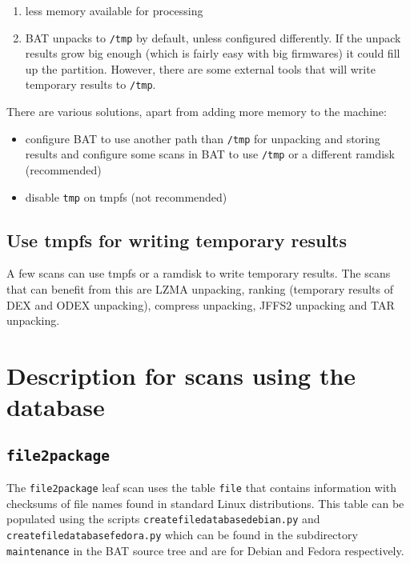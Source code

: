 \documentclass[10pt,a4paper]{article}
\begin{document}
\begin{enumerate}
\item less memory available for processing
\item BAT unpacks to \texttt{/tmp} by default, unless configured differently. If
the unpack results grow big enough (which is fairly easy with big firmwares) it
could fill up the partition. However, there are some external tools that will
write temporary results to \texttt{/tmp}.
\end{enumerate}

There are various solutions, apart from adding more memory to the machine:

\begin{itemize}
\item configure BAT to use another path than \texttt{/tmp} for unpacking and
storing results and configure some scans in BAT to use \texttt{/tmp} or a
different ramdisk (recommended)
\item disable \texttt{tmp} on tmpfs (not recommended)
\end{itemize}

\subsection{Use tmpfs for writing temporary results}

A few scans can use tmpfs or a ramdisk to write temporary results. The scans
that can benefit from this are LZMA unpacking, ranking (temporary results of
DEX and ODEX unpacking), compress unpacking, JFFS2 unpacking and TAR unpacking.

\section{Description for scans using the database}

\subsection{\texttt{file2package}}

The \texttt{file2package} leaf scan uses the table \texttt{file} that contains
information with checksums of file names found in standard Linux distributions.
This table can be populated using the scripts
\texttt{createfiledatabasedebian.py} and \texttt{createfiledatabasefedora.py}
which can be found in the subdirectory \texttt{maintenance} in the BAT source
tree and are for Debian and Fedora respectively.
\end{document}
